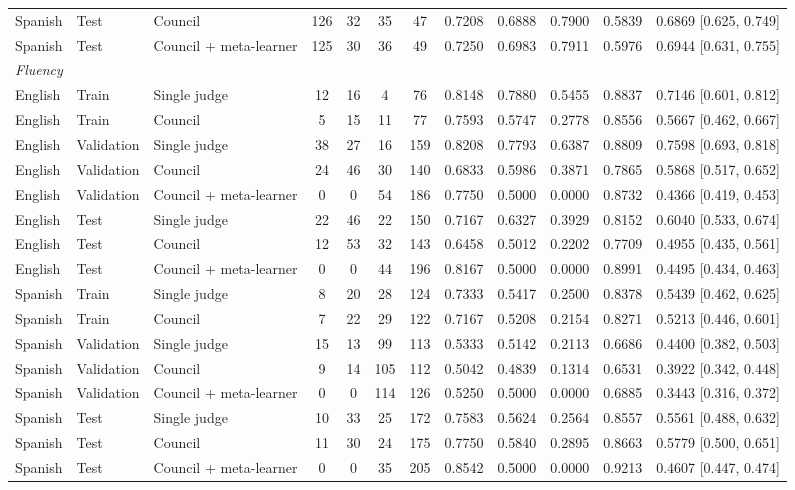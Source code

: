 \begin{tabular}{lllccccccccc}
Spanish & Test & Council & 126 & 32 & 35 & 47 & 0.7208 & 0.6888 & 0.7900 & 0.5839 & 0.6869 [0.625, 0.749] \\
Spanish & Test & Council + meta-learner & 125 & 30 & 36 & 49 & 0.7250 & 0.6983 & 0.7911 & 0.5976 & 0.6944 [0.631, 0.755] \\
\hline
\multicolumn{12}{l}{\textit{Fluency}} \\
\hline
English & Train & Single judge & 12 & 16 & 4 & 76 & 0.8148 & 0.7880 & 0.5455 & 0.8837 & 0.7146 [0.601, 0.812] \\
English & Train & Council & 5 & 15 & 11 & 77 & 0.7593 & 0.5747 & 0.2778 & 0.8556 & 0.5667 [0.462, 0.667] \\
English & Validation & Single judge & 38 & 27 & 16 & 159 & 0.8208 & 0.7793 & 0.6387 & 0.8809 & 0.7598 [0.693, 0.818] \\
English & Validation & Council & 24 & 46 & 30 & 140 & 0.6833 & 0.5986 & 0.3871 & 0.7865 & 0.5868 [0.517, 0.652] \\
English & Validation & Council + meta-learner & 0 & 0 & 54 & 186 & 0.7750 & 0.5000 & 0.0000 & 0.8732 & 0.4366 [0.419, 0.453] \\
English & Test & Single judge & 22 & 46 & 22 & 150 & 0.7167 & 0.6327 & 0.3929 & 0.8152 & 0.6040 [0.533, 0.674] \\
English & Test & Council & 12 & 53 & 32 & 143 & 0.6458 & 0.5012 & 0.2202 & 0.7709 & 0.4955 [0.435, 0.561] \\
English & Test & Council + meta-learner & 0 & 0 & 44 & 196 & 0.8167 & 0.5000 & 0.0000 & 0.8991 & 0.4495 [0.434, 0.463] \\
Spanish & Train & Single judge & 8 & 20 & 28 & 124 & 0.7333 & 0.5417 & 0.2500 & 0.8378 & 0.5439 [0.462, 0.625] \\
Spanish & Train & Council & 7 & 22 & 29 & 122 & 0.7167 & 0.5208 & 0.2154 & 0.8271 & 0.5213 [0.446, 0.601] \\
Spanish & Validation & Single judge & 15 & 13 & 99 & 113 & 0.5333 & 0.5142 & 0.2113 & 0.6686 & 0.4400 [0.382, 0.503] \\
Spanish & Validation & Council & 9 & 14 & 105 & 112 & 0.5042 & 0.4839 & 0.1314 & 0.6531 & 0.3922 [0.342, 0.448] \\
Spanish & Validation & Council + meta-learner & 0 & 0 & 114 & 126 & 0.5250 & 0.5000 & 0.0000 & 0.6885 & 0.3443 [0.316, 0.372] \\
Spanish & Test & Single judge & 10 & 33 & 25 & 172 & 0.7583 & 0.5624 & 0.2564 & 0.8557 & 0.5561 [0.488, 0.632] \\
Spanish & Test & Council & 11 & 30 & 24 & 175 & 0.7750 & 0.5840 & 0.2895 & 0.8663 & 0.5779 [0.500, 0.651] \\
Spanish & Test & Council + meta-learner & 0 & 0 & 35 & 205 & 0.8542 & 0.5000 & 0.0000 & 0.9213 & 0.4607 [0.447, 0.474] \\
\hline
\end{tabular}
